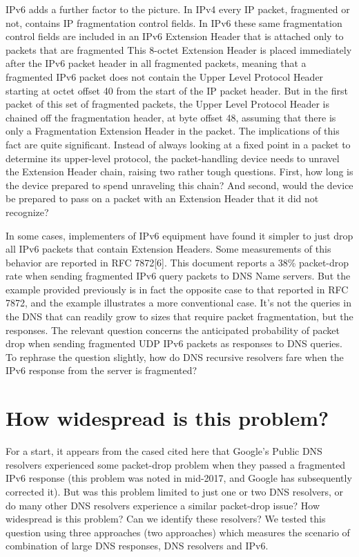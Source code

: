 IPv6 adds a further factor to the picture. In IPv4 every IP packet, fragmented
or not, contains IP fragmentation control fields. In IPv6 these
same fragmentation control fields are included in an IPv6 Extension
Header that is attached only to packets that are fragmented This 8-octet 
Extension Header is placed immediately after the IPv6
packet header in all fragmented packets, meaning that a fragmented
IPv6 packet does not contain the Upper Level Protocol Header starting
at octet offset 40 from the start of the IP packet header. But in
the first packet of this set of fragmented packets, the Upper Level
Protocol Header is chained off the fragmentation header, at byte offset
48, assuming that there is only a Fragmentation Extension Header
in the packet. The implications of this fact are quite significant.
Instead of always looking at a fixed point in a packet to determine its
upper-level protocol, the packet-handling device needs to unravel the
Extension Header chain, raising two rather tough questions. First,
how long is the device prepared to spend unraveling this chain? And
second, would the device be prepared to pass on a packet with an
Extension Header that it did not recognize?

In some cases, implementers of IPv6 equipment have found it simpler
to just drop all IPv6 packets that contain Extension Headers. Some
measurements of this behavior are reported in RFC 7872[6]. This
document reports a 38\% packet-drop rate when sending fragmented
IPv6 query packets to DNS Name servers. But the example provided
previously is in fact the opposite case to that reported in RFC 7872,
and the example illustrates a more conventional case. It’s not the
queries in the DNS that can readily grow to sizes that require packet
fragmentation, but the responses. The relevant question concerns
the anticipated probability of packet drop when sending fragmented
UDP IPv6 packets as responses to DNS queries. To rephrase the question
slightly, how do DNS recursive resolvers fare when the IPv6
response from the server is fragmented?


\section{How widespread is this problem?}


For a start, it appears from the cased cited here that Google’s
Public DNS resolvers experienced some packet-drop problem when
they passed a fragmented IPv6 response (this problem was noted in
mid-2017, and Google has subsequently corrected it). But was this
problem limited to just one or two DNS resolvers, or do many other
DNS resolvers experience a similar packet-drop issue? How widespread
is this problem? Can we identify these resolvers? We tested this 
question using three approaches (two approaches) which measures the
scenario of combination of large DNS responses, DNS resolvers and IPv6.

